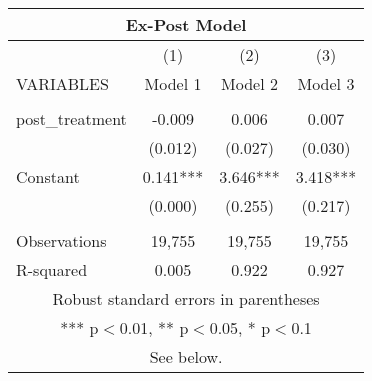 \begin{tabular}{lccc}
\multicolumn{4}{c}{Ex-Post Model} \\ \hline
 & (1) & (2) & (3) \\
VARIABLES & Model 1 & Model 2 & Model 3 \\ \hline
 &  &  &  \\
post\_treatment & -0.009 & 0.006 & 0.007 \\
 & (0.012) & (0.027) & (0.030) \\
Constant & 0.141*** & 3.646*** & 3.418*** \\
 & (0.000) & (0.255) & (0.217) \\
 &  &  &  \\
Observations & 19,755 & 19,755 & 19,755 \\
 R-squared & 0.005 & 0.922 & 0.927 \\ \hline
\multicolumn{4}{c}{ Robust standard errors in parentheses} \\
\multicolumn{4}{c}{ *** p$<$0.01, ** p$<$0.05, * p$<$0.1} \\
\multicolumn{4}{c}{ See below.} \\
\end{tabular}
